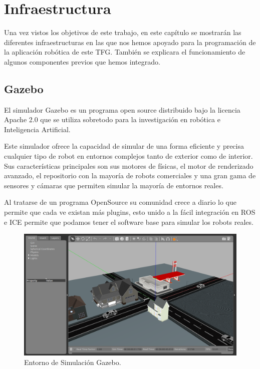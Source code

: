 \chapter{Infraestructura}\label{cap.infraestructura}
\hspace{1cm} Una vez vistos los objetivos de este trabajo, en este capítulo se mostrarán las diferentes infraestructuras en las que nos hemos apoyado para la programación de la aplicación robótica de este TFG. También se explicara el funcionamiento de algunos componentes previos que hemos integrado.

\section{Gazebo}
\hspace{1cm} El simulador Gazebo es un programa open source distribuido bajo la licencia Apache 2.0 que se utiliza sobretodo para la investigación en robótica e Inteligencia Artificial.

\hspace{1cm} Este simulador ofrece la capacidad de simular de una forma eficiente y precisa cualquier tipo de robot en entornos complejos tanto de exterior como de interior. Sus características principales son sus motores de físicas, el motor de renderizado avanzado, el repositorio con la mayoría de robots comerciales y una gran gama de sensores y cámaras que permiten simular la mayoría de entornos reales.

\hspace{1cm} Al tratarse de un programa OpenSource su comunidad crece a diario lo que permite que cada ve existan más plugins, esto unido a la fácil integración en ROS e ICE permite que podamos tener el software base para simular los robots reales.
\\

\begin{figure}[H]
	\begin{center}
		\includegraphics[width=1\textwidth]{imag/IMG18.png}
				\caption{Entorno de Simulación Gazebo.} 
	\label{fig:Gazebo.}	
	\end{center}
\end{figure}

